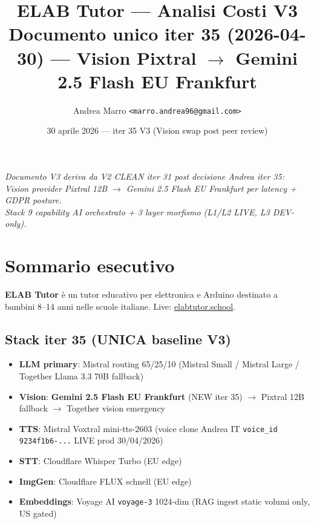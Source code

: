 \documentclass[12pt,a4paper]{article}
\title{\color{elabnavy}\textbf{ELAB Tutor --- Analisi Costi V3}\\
\large Documento unico iter 35 (2026-04-30) --- Vision Pixtral \(\rightarrow\) Gemini 2.5 Flash EU Frankfurt}
\author{Andrea Marro \texttt{<marro.andrea96@gmail.com>}}
\date{30 aprile 2026 --- iter 35 V3 (Vision swap post peer review)}
\begin{document}
\maketitle
\thispagestyle{empty}

\begin{center}
\color{elabgray}\textit{Documento V3 deriva da V2 CLEAN iter 31 post decisione Andrea iter 35: \\
Vision provider Pixtral 12B \(\rightarrow\) Gemini 2.5 Flash EU Frankfurt per latency + GDPR posture. \\
Stack 9 capability AI orchestrato + 3 layer morfismo (L1/L2 LIVE, L3 DEV-only).}
\end{center}

\vspace{0.5cm}

\tableofcontents
\newpage

\section{Sommario esecutivo}

\textbf{ELAB Tutor} è un tutor educativo per elettronica e Arduino destinato a bambini 8--14 anni nelle scuole italiane. Live: \href{https://www.elabtutor.school}{elabtutor.school}.

\subsection*{Stack iter 35 (UNICA baseline V3)}

\begin{itemize}[leftmargin=*]
  \item \textbf{LLM primary}: Mistral routing 65/25/10 (Mistral Small / Mistral Large / Together Llama 3.3 70B fallback)
  \item \textbf{Vision}: \textbf{Gemini 2.5 Flash EU Frankfurt} (NEW iter 35) \(\rightarrow\) Pixtral 12B fallback \(\rightarrow\) Together vision emergency
  \item \textbf{TTS}: Mistral Voxtral mini-tts-2603 (voice clone Andrea IT \texttt{voice\_id 9234f1b6-...} LIVE prod 30/04/2026)
  \item \textbf{STT}: Cloudflare Whisper Turbo (EU edge)
  \item \textbf{ImgGen}: Cloudflare FLUX schnell (EU edge)
  \item \textbf{Embeddings}: Voyage AI \texttt{voyage-3} 1024-dim (RAG ingest static volumi only, US gated)
\end{itemize}
\end{document}

